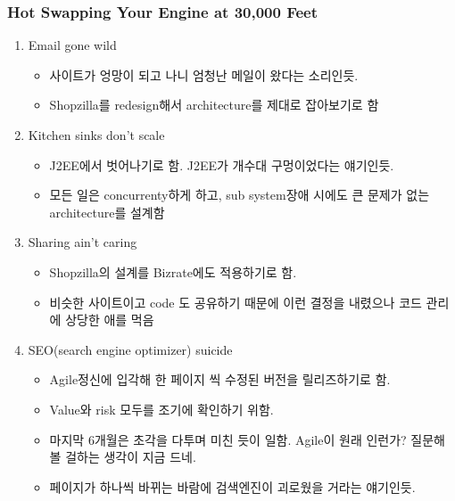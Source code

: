 \begin{frame}
\frametitle{Hot Swapping Your Engine at 30,000 Feet}

\begin{enumerate}
\item Email gone wild
    \begin{itemize}
    \item 사이트가 엉망이 되고 나니 엄청난 메일이 왔다는 소리인듯. 
    \item Shopzilla를 redesign해서 architecture를 제대로 잡아보기로 함
    \end{itemize}
\item Kitchen sinks don't scale
    \begin{itemize}
    \item J2EE에서 벗어나기로 함. J2EE가 개수대 구멍이었다는 얘기인듯.
    \item 모든 일은 concurrenty하게 하고, sub system장애 시에도 큰 문제가 없는 architecture를 설계함
    \end{itemize}
\item Sharing ain't caring
    \begin{itemize}
    \item Shopzilla의 설계를 Bizrate에도 적용하기로 함.
    \item 비슷한 사이트이고 code 도 공유하기 때문에 이런 결정을 내렸으나 코드 관리에 상당한 애를 먹음
    \end{itemize}
\item SEO(search engine optimizer) suicide
    \begin{itemize}
    \item Agile정신에 입각해 한 페이지 씩 수정된 버전을 릴리즈하기로 함.
    \item Value와 risk 모두를 조기에 확인하기 위함.
    \item 마지막 6개월은 초각을 다투며 미친 듯이 일함. Agile이 원래 인런가? 질문해 볼 걸하는 생각이 지금 드네.
    \item 페이지가 하나씩 바뀌는 바람에  검색엔진이 괴로웠을 거라는 얘기인듯.
    \end{itemize}
\end{enumerate}
\end{frame}
